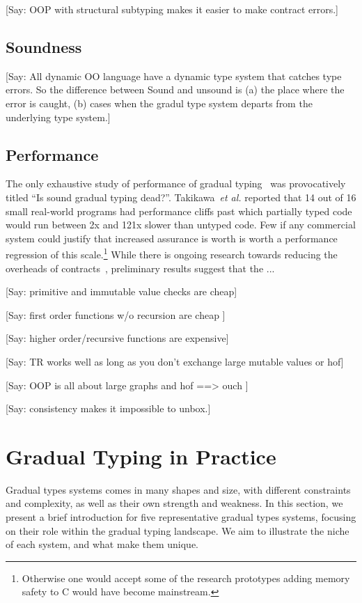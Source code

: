 \documentclass[a4paper,USenglish]{tex/lipics-v2016}
\begin{document}
[Say: OOP with structural subtyping makes it easier to make contract errors.]


\subsection{Soundness}

[Say: All dynamic OO language have a dynamic type system that catches type errors.  
So the difference between Sound and unsound is (a) the place where the error is caught, 
(b) cases when the gradul type system departs from the underlying type system.]  

\subsection{Performance}

The only exhaustive study of performance of gradual typing~\cite{popl16} was
provocatively titled ``Is sound gradual typing dead?''.  Takikawa~\emph{et
  al.}  reported that 14 out of 16 small real-world programs had performance
cliffs past which partially typed code would run between 2x and 121x slower
than untyped code. Few if any commercial system could justify that increased
assurance is worth is worth a performance regression of this
scale.\footnote{Otherwise one would accept some of the research prototypes
  adding memory safety to C would have become mainstream.} While there is
ongoing research towards reducing the overheads of
contracts~\cite{pycket15}, preliminary results suggest that the ...


[Say: primitive and immutable value checks are cheap]

[Say: first order functions w/o recursion are cheap ]

[Say: higher order/recursive functions are expensive]

[Say: TR works well as long as you don't exchange large mutable values or hof]

[Say: OOP is all about large graphs and hof ==> ouch ]

[Say: consistency makes it impossible to unbox.]

\section{Gradual Typing in Practice}

Gradual types systems comes in many shapes and size, with different
constraints and complexity, as well as their own strength and weakness. In
this section, we present a brief introduction for five representative
gradual types systems, focusing on their role within the gradual typing
landscape. We aim to illustrate the niche of each system, and what make them
unique.
\end{document}
